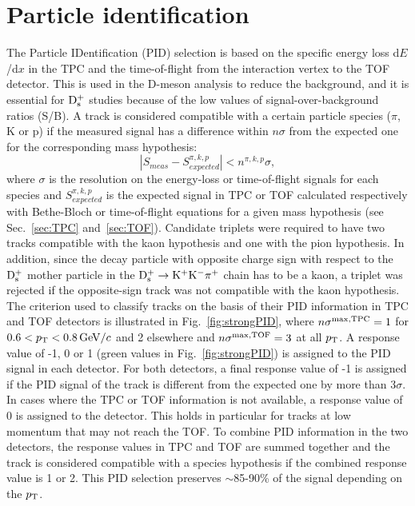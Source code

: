 \section{Particle identification}
\label{Sec:PID}
The Particle IDentification (PID) selection is based on the specific energy loss 
d$E$/d$x$ in the TPC and the time-of-flight from the interaction vertex to the 
TOF detector. This is used in the D-meson analysis to reduce the background, 
and it is essential for ${\rm D_s^+}$ studies because of the low values of signal-over-background
 ratios (S/B).
A track is  considered compatible with a certain particle species 
($\pi$, K or p) if the measured signal has a difference 
within $n\sigma$ from the expected one for the corresponding mass hypothesis:
\[
|S_{meas}-S^{\pi,k,p}_{expected}| < n^{\pi,k,p}\sigma ,
\]
where $\sigma$ is the resolution on the energy-loss or time-of-flight signals for each species
and $S^{\pi,k,p}_{expected}$ is the expected signal in TPC or TOF
calculated respectively with Bethe-Bloch or time-of-flight equations for a given mass hypothesis (see Sec.~\ref{sec:TPC} and~\ref{sec:TOF}).
Candidate triplets were required to have two tracks compatible with 
the kaon hypothesis and one with the pion hypothesis. In addition, 
since the decay particle with opposite charge sign with respect to the ${\rm D_s^+}$
mother particle in the ${\rm D^{+}_\mathrm{s}\to K^+ K^-\pi^+}$ chain has to be a kaon, 
a triplet was rejected if the opposite-sign track was not compatible 
with the kaon hypothesis. 
The criterion used to classify tracks on the basis of their PID
information in TPC and TOF detectors is 
illustrated in Fig.~\ref{fig:strongPID}, where $n\sigma^{\rm max,TPC} = 1$ for
$0.6 < p_{\rm T} < 0.8 \, \mathrm{GeV}/c$ and 2 elsewhere and $n\sigma^{\rm max,TOF} = 3$ at all $p_{\rm T}$.  
A response value of -1, 0 or 1 (green values in Fig.~\ref{fig:strongPID}) 
is assigned to the PID signal in each
detector. For both detectors, a final response value of -1 is assigned   
if the PID signal of the track is different from the expected one
by more than 3$\sigma$. In cases where the TPC or TOF information is not
available, a response value of 0 is assigned
to the detector. This holds in particular for tracks at low momentum that may not reach the TOF.  
To combine PID information in the two detectors,
the response values in TPC and TOF 
are summed together and the track is considered
compatible with a species hypothesis if the combined response value is 1 or 2. This
PID selection preserves $\sim$85-90\% of the signal depending on the $p_{\rm T}$.

